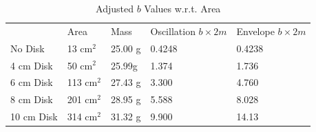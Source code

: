 \documentclass[12pt,letterpaper]{article}
\begin{document}
\begin{table}[ht]
\centering
\begin{tabular}{lllll}
                                & Area                            & Mass                         & Oscillation $b\times 2m$ & Envelope $b\times 2m$ \\ \cline{2-5} 
\multicolumn{1}{l|}{No Disk}    & \multicolumn{1}{l|}{13 cm$^2$}  & \multicolumn{1}{l|}{25.00 g} & \multicolumn{1}{l|}{0.4248}             & \multicolumn{1}{l|}{0.4238}          \\ \cline{2-5} 
\multicolumn{1}{l|}{4 cm Disk}  & \multicolumn{1}{l|}{50 cm$^2$}  & \multicolumn{1}{l|}{25.99g}  & \multicolumn{1}{l|}{1.374}              & \multicolumn{1}{l|}{1.736}           \\ \cline{2-5} 
\multicolumn{1}{l|}{6 cm Disk}  & \multicolumn{1}{l|}{113 cm$^2$} & \multicolumn{1}{l|}{27.43 g} & \multicolumn{1}{l|}{3.300}              & \multicolumn{1}{l|}{4.760}           \\ \cline{2-5} 
\multicolumn{1}{l|}{8 cm Disk}  & \multicolumn{1}{l|}{201 cm$^2$} & \multicolumn{1}{l|}{28.95 g} & \multicolumn{1}{l|}{5.588}              & \multicolumn{1}{l|}{8.028}           \\ \cline{2-5} 
\multicolumn{1}{l|}{10 cm Disk} & \multicolumn{1}{l|}{314 cm$^2$} & \multicolumn{1}{l|}{31.32 g} & \multicolumn{1}{l|}{9.900}              & \multicolumn{1}{l|}{14.13}           \\ \cline{2-5} 
\end{tabular}
\caption{Adjusted $b$ Values w.r.t. Area}
\label{tab:barea}
\end{table}
\end{document}
